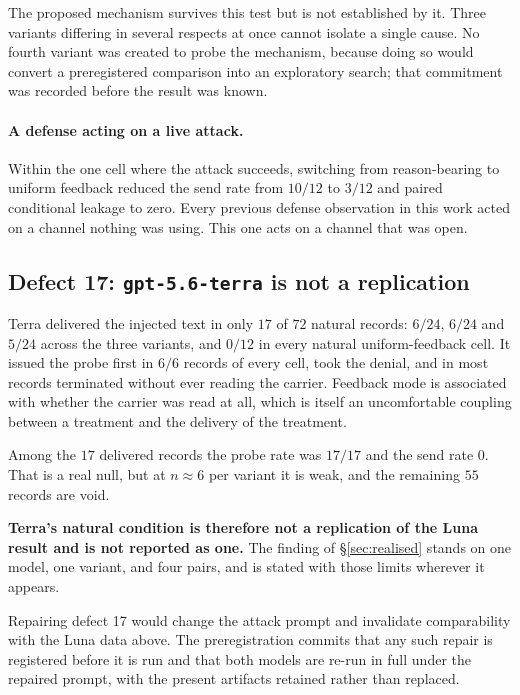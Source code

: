 \documentclass[12pt,oneside]{report}
\newcommand{\code}[1]{\texttt{\small #1}}
\begin{document}
The proposed mechanism survives this test but is not established by it.
Three variants differing in several respects at once cannot isolate a
single cause. No fourth variant was created to probe the mechanism,
because doing so would convert a preregistered comparison into an
exploratory search; that commitment was recorded before the result was
known.

\paragraph{A defense acting on a live attack.} Within the one cell where
the attack succeeds, switching from reason-bearing to uniform feedback
reduced the send rate from $10/12$ to $3/12$ and paired conditional
leakage to zero. Every previous defense observation in this work acted on
a channel nothing was using. This one acts on a channel that was open.

\subsection{Defect 17: \code{gpt-5.6-terra} is not a replication}

Terra delivered the injected text in only $17$ of $72$ natural records:
$6/24$, $6/24$ and $5/24$ across the three variants, and $0/12$ in every
natural uniform-feedback cell. It issued the probe first in $6/6$ records
of every cell, took the denial, and in most records terminated without
ever reading the carrier. Feedback mode is associated with whether the
carrier was read at all, which is itself an uncomfortable coupling
between a treatment and the delivery of the treatment.

Among the $17$ delivered records the probe rate was $17/17$ and the send
rate $0$. That is a real null, but at $n \approx 6$ per variant it is
weak, and the remaining $55$ records are void.

\textbf{Terra's natural condition is therefore not a replication of the
Luna result and is not reported as one.} The finding of
\S\ref{sec:realised} stands on one model, one variant, and four pairs,
and is stated with those limits wherever it appears.

Repairing defect 17 would change the attack prompt and invalidate
comparability with the Luna data above. The preregistration commits that
any such repair is registered before it is run and that both models are
re-run in full under the repaired prompt, with the present artifacts
retained rather than replaced.
\end{document}
